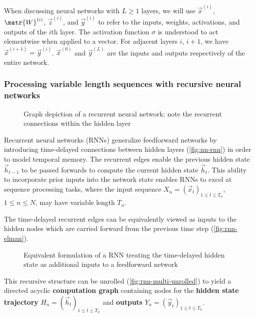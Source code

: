 When discussing neural networks with $L \geq 1$ layers, we will use
$\vec{x}^{(i)}$, $\matr{W}^{(i)}$, $\vec{z}^{(i)}$, and $\vec{y}^{(i)}$ to
refer to the inputs, weights, activations, and outputs of the $i$th layer. The
activation function $\sigma$ is understood to act elementwise when applied to a
vector. For adjacent layers $i$, $i+1$, we have $\vec{x}^{(i+1)} =
\vec{y}^{(i)}$. $\vec{x}^{(0)}$ and $\vec{y}^{(L)}$ are the inputs and outputs
respectively of the entire network.

\subsubsection{Processing variable length sequences with recursive neural networks}

\begin{figure}[htpb]
    \centering
    
    \caption{Graph depiction of a recurrent neural network; note the recurrent connections
    within the hidden layer}
    \label{fig:nn-rnn}
\end{figure}

Recurrent neural networks (RNNs) generalize feedforward networks by introducing
time-delayed connections between hidden layers (\autoref{fig:nn-rnn}) in order
to model temporal memory. The recurrent edges enable the previous hidden state
$\vec{h}_{t-1}$ to be passed forwards to compute the current hidden state
$\vec{h}_t$. This ability to incorporate prior inputs into the network state
enables RNNs to excel at sequence processing tasks, where the input sequence
$X_n = (\vec{x}_t)_{1 \leq t \leq T_n}$, $1 \leq n \leq N$, may have variable
length $T_n$.

The time-delayed recurrent edges can be equivalently viewed as inputs to the
hidden nodes which are carried forward from the previous time step
(\autoref{fig:rnn-elman}).

\begin{figure}[htpb]
    \centering
    
    \caption{Equivalent formulation of a RNN treating the time-delayed hidden state
    as additional inputs to a feedforward network}
    \label{fig:rnn-elman}
\end{figure}

This recursive structure can be unrolled
(\autoref{fig:rnn-multi-unrolled}) to yield a directed acyclic
\textbf{computation graph} containing nodes for the
\textbf{hidden state trajectory} $H_n = (\vec{h}_t)_{1 \leq t \leq T_n}$ and
\textbf{outputs} $Y_n = (\vec{y}_t)_{1 \leq t \leq T_n}$.

